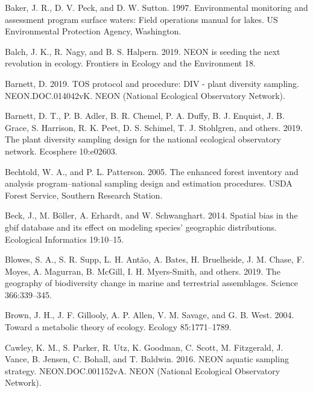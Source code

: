 \documentclass[
  12pt,
]{article}
\newlength{\cslhangindent}
\newenvironment{cslreferences}%
  {\setlength{\parindent}{0pt}%
  \everypar{\setlength{\hangindent}{\cslhangindent}}\ignorespaces}%
  {\par}
\begin{document}
\hypertarget{refs}{}
\begin{cslreferences}
\leavevmode\hypertarget{ref-baker1997environmental}{}%
Baker, J. R., D. V. Peck, and D. W. Sutton. 1997. Environmental monitoring and assessment program surface waters: Field operations manual for lakes. US Environmental Protection Agency, Washington.

\leavevmode\hypertarget{ref-balch2019neon}{}%
Balch, J. K., R. Nagy, and B. S. Halpern. 2019. NEON is seeding the next revolution in ecology. Frontiers in Ecology and the Environment 18.

\leavevmode\hypertarget{ref-Barnett2019}{}%
Barnett, D. 2019. TOS protocol and procedure: DIV - plant diversity sampling. NEON.DOC.014042vK. NEON (National Ecological Observatory Network).

\leavevmode\hypertarget{ref-barnett2019plant}{}%
Barnett, D. T., P. B. Adler, B. R. Chemel, P. A. Duffy, B. J. Enquist, J. B. Grace, S. Harrison, R. K. Peet, D. S. Schimel, T. J. Stohlgren, and others. 2019. The plant diversity sampling design for the national ecological observatory network. Ecosphere 10:e02603.

\leavevmode\hypertarget{ref-bechtold2005enhanced}{}%
Bechtold, W. A., and P. L. Patterson. 2005. The enhanced forest inventory and analysis program--national sampling design and estimation procedures. USDA Forest Service, Southern Research Station.

\leavevmode\hypertarget{ref-beck2014spatial}{}%
Beck, J., M. Böller, A. Erhardt, and W. Schwanghart. 2014. Spatial bias in the gbif database and its effect on modeling species' geographic distributions. Ecological Informatics 19:10--15.

\leavevmode\hypertarget{ref-blowes2019geography}{}%
Blowes, S. A., S. R. Supp, L. H. Antão, A. Bates, H. Bruelheide, J. M. Chase, F. Moyes, A. Magurran, B. McGill, I. H. Myers-Smith, and others. 2019. The geography of biodiversity change in marine and terrestrial assemblages. Science 366:339--345.

\leavevmode\hypertarget{ref-brown2004toward}{}%
Brown, J. H., J. F. Gillooly, A. P. Allen, V. M. Savage, and G. B. West. 2004. Toward a metabolic theory of ecology. Ecology 85:1771--1789.

\leavevmode\hypertarget{ref-Cawley2016}{}%
Cawley, K. M., S. Parker, R. Utz, K. Goodman, C. Scott, M. Fitzgerald, J. Vance, B. Jensen, C. Bohall, and T. Baldwin. 2016. NEON aquatic sampling strategy. NEON.DOC.001152vA. NEON (National Ecological Observatory Network).


\end{cslreferences}
\end{document}

